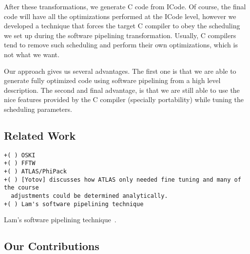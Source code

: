 \documentclass[10pt]{article}
\begin{document}
After these transformations, we generate C code from ICode. Of course, the final code will
have all the optimizations performed at the ICode level, however we developed a technique that
forces the target C compiler to obey the scheduling we set up during the software pipelining
transformation. Usually, C compilers tend to remove such scheduling and perform their own optimizations,
which is not what we want.

Our approach gives us several advantages. The first one is that we are able to generate fully optimized
code using software pipelining from a high level description. The second and final advantage, is that
we are still able to use the nice features provided by the C compiler (specially portability)
while tuning the scheduling parameters. 


\begin{comment}
+( ) Work directly in the SPIRAL intermediate code. Any optimization that is done
  here can benefit any operation expressed at a higher level of abstraction.

+( ) We use Software Pipelining in addition to loop unrolling and other
  optimizations that we can fine tune.

+( ) We generate the target code in C and use a quality production compiler.

+( ) But we instrument our code in such a way that we can force a particular
  schedule on our code.

+( ) Thus we get all of the benefits of APGS and the ability to even tune
  schedules, but we can still take advantage of the compiler for dealing with
  mapping our implementation to assembly (reg alloc and such).
\end{comment}

\subsection{Related Work}

\begin{verbatim}
+( ) OSKI
+( ) FFTW
+( ) ATLAS/PhiPack
+( ) [Yotov] discusses how ATLAS only needed fine tuning and many of the course
  adjustments could be determined analytically.
+( ) Lam's software pipelining technique
\end{verbatim}

Lam's software pipelining technique~\cite{Lam:04}.

\subsection{Our Contributions}
\end{document}
